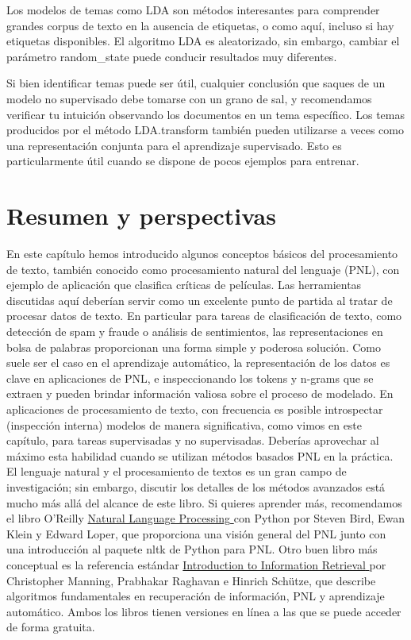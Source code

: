 Los modelos de temas como LDA son métodos interesantes para comprender grandes corpus de texto en
la ausencia de etiquetas,  o  como aquí, incluso si hay etiquetas disponibles. 
El algoritmo LDA es aleatorizado, sin embargo,  cambiar el parámetro 
 {\ttfamily random\_state} puede conducir resultados muy diferentes.


 Si bien identificar temas puede ser útil, cualquier conclusión que saques de un modelo no supervisado debe tomarse con un grano de sal, y recomendamos verificar tu intuición observando los documentos en un tema específico. 
 Los temas producidos por el método {\ttfamily LDA.transform}  también pueden utilizarse a veces como una representación conjunta para el aprendizaje supervisado. Esto es particularmente útil cuando se dispone de pocos ejemplos para entrenar.



\section{Resumen y perspectivas}


En este capítulo hemos introducido algunos   conceptos básicos del procesamiento de texto, también conocido como  procesamiento natural  del lenguaje (PNL), con  ejemplo de   aplicación   que clasifica críticas de películas. 
Las herramientas discutidas aquí deberían servir como un excelente punto de partida
 al tratar de procesar datos de texto. En particular para tareas de clasificación de texto, como detección de spam y fraude o análisis de sentimientos, las representaciones en bolsa de palabras proporcionan una forma simple y poderosa solución.    Como suele ser el caso en el aprendizaje automático, la representación de los datos es clave
en aplicaciones de PNL, e inspeccionando los tokens y n-grams   que  se  extraen y pueden
brindar información valiosa sobre el proceso de modelado.  En aplicaciones de procesamiento de texto, con frecuencia es posible introspectar   (inspección interna)  modelos de manera significativa, como vimos en este capítulo, para tareas supervisadas y no supervisadas.  Deberías aprovechar al máximo esta habilidad cuando se utilizan métodos basados PNL en la práctica.\\


El lenguaje natural y el procesamiento de textos es un gran campo de investigación; sin embargo, 
discutir los detalles de los métodos avanzados está mucho más allá del alcance de este libro.
Si quieres aprender más, recomendamos el libro  O’Reilly  \href{https://www.oreilly.com/library/view/natural-language-processing/9780596803346/}{\textcolor{vino}{ Natural Language Processing} }  con Python por Steven Bird, Ewan Klein y Edward Loper, que proporciona una visión general del  PNL junto con una introducción al paquete {\ttfamily nltk}  de Python para PNL. 
Otro buen libro más conceptual es la referencia estándar \href{https://nlp.stanford.edu/IR-book/}{\textcolor{vino}{Introduction to Information Retrieval} }
por Christopher Manning, Prabhakar Raghavan e Hinrich Schütze, que describe
algoritmos fundamentales en recuperación de información, PNL y aprendizaje automático. Ambos
los libros tienen versiones en línea a las que se puede acceder de forma gratuita.

